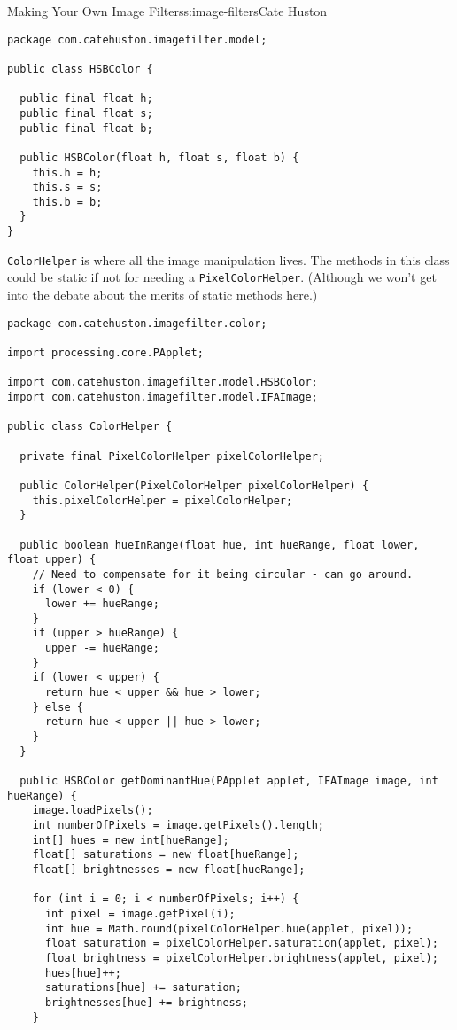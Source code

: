 \begin{aosachapter}{Making Your Own Image Filters}{s:image-filters}{Cate Huston}
\begin{verbatim}
package com.catehuston.imagefilter.model;

public class HSBColor {

  public final float h;
  public final float s;
  public final float b;

  public HSBColor(float h, float s, float b) {
    this.h = h;
    this.s = s;
    this.b = b;
  }
}
\end{verbatim}

\label{colorhelper-and-associated-tests}

\texttt{ColorHelper} is where all the image manipulation lives. The
methods in this class could be static if not for needing a
\texttt{PixelColorHelper}. (Although we won't get into the debate about
the merits of static methods here.)

\begin{verbatim}
package com.catehuston.imagefilter.color;

import processing.core.PApplet;

import com.catehuston.imagefilter.model.HSBColor;
import com.catehuston.imagefilter.model.IFAImage;

public class ColorHelper {

  private final PixelColorHelper pixelColorHelper;

  public ColorHelper(PixelColorHelper pixelColorHelper) {
    this.pixelColorHelper = pixelColorHelper;
  }

  public boolean hueInRange(float hue, int hueRange, float lower, float upper) {
    // Need to compensate for it being circular - can go around.
    if (lower < 0) {
      lower += hueRange;
    }
    if (upper > hueRange) {
      upper -= hueRange;
    }
    if (lower < upper) {
      return hue < upper && hue > lower;
    } else {
      return hue < upper || hue > lower;
    }
  }

  public HSBColor getDominantHue(PApplet applet, IFAImage image, int hueRange) {
    image.loadPixels();
    int numberOfPixels = image.getPixels().length;
    int[] hues = new int[hueRange];
    float[] saturations = new float[hueRange];
    float[] brightnesses = new float[hueRange];

    for (int i = 0; i < numberOfPixels; i++) {
      int pixel = image.getPixel(i);
      int hue = Math.round(pixelColorHelper.hue(applet, pixel));
      float saturation = pixelColorHelper.saturation(applet, pixel);
      float brightness = pixelColorHelper.brightness(applet, pixel);
      hues[hue]++;
      saturations[hue] += saturation;
      brightnesses[hue] += brightness;
    }


\end{verbatim}
\end{aosachapter}
